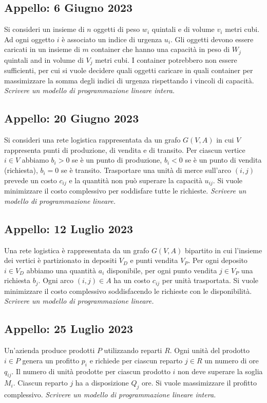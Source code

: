 \documentclass[11pt, a4paper]{article}
\begin{document}
\subsection{Appello: 6 Giugno 2023}
Si consideri un insieme di $n$ oggetti di peso $w_i$ quintali e di volume $v_i$ metri cubi. Ad ogni oggetto $i$ è associato un indice di urgenza $u_i$. Gli oggetti devono essere caricati in un insieme di $m$ container che hanno una capacità in peso di $W_j$ quintali and in volume di $V_j$ metri cubi. I container potrebbero non essere sufficienti, per cui si vuole decidere quali oggetti caricare in quali container per massimizzare la somma degli indici di urgenza rispettando i vincoli di capacità.
\textit{Scrivere un modello di programmazione lineare intera.}

\subsection{Appello: 20 Giugno 2023}
Si consideri una rete logistica rappresentata da un grafo $G(V,A)$ in cui $V$ rappresenta punti di produzione, di vendita e di transito. Per ciascun vertice $i \in V$ abbiamo $b_i > 0$ se è un punto di produzione, $b_i < 0$ se è un punto di vendita (richiesta), $b_i = 0$ se è transito. Trasportare una unità di merce sull'arco $(i,j)$ prevede un costo $c_{ij}$ e la quantità non può superare la capacità $u_{ij}$. Si vuole minimizzare il costo complessivo per soddisfare tutte le richieste.
\textit{Scrivere un modello di programmazione lineare.}

\subsection{Appello: 12 Luglio 2023}
Una rete logistica è rappresentata da un grafo $G(V,A)$ bipartito in cui l'insieme dei vertici è partizionato in depositi $V_D$ e punti vendita $V_P$. Per ogni deposito $i \in V_D$ abbiamo una quantità $a_i$ disponibile, per ogni punto vendita $j \in V_P$ una richiesta $b_j$. Ogni arco $(i,j) \in A$ ha un costo $c_{ij}$ per unità trasportata. Si vuole minimizzare il costo complessivo soddisfacendo le richieste con le disponibilità.
\textit{Scrivere un modello di programmazione lineare.}

\subsection{Appello: 25 Luglio 2023}
Un'azienda produce prodotti $P$ utilizzando reparti $R$. Ogni unità del prodotto $i \in P$ genera un profitto $p_i$ e richiede per ciascun reparto $j \in R$ un numero di ore $q_{ij}$. Il numero di unità prodotte per ciascun prodotto $i$ non deve superare la soglia $M_i$. Ciascun reparto $j$ ha a disposizione $Q_j$ ore. Si vuole massimizzare il profitto complessivo.
\textit{Scrivere un modello di programmazione lineare intera.}
\end{document}
